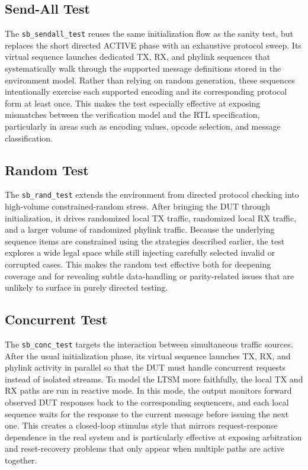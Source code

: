 \subsection{Send-All Test}
The \texttt{sb\_sendall\_test} reuses the same initialization flow as the sanity test, but replaces the short directed ACTIVE phase with an exhaustive protocol sweep. Its virtual sequence launches dedicated TX, RX, and phylink sequences that systematically walk through the supported message definitions stored in the environment model. Rather than relying on random generation, these sequences intentionally exercise each supported encoding and its corresponding protocol form at least once. This makes the test especially effective at exposing mismatches between the verification model and the RTL specification, particularly in areas such as encoding values, opcode selection, and message classification.

\subsection{Random Test}
The \texttt{sb\_rand\_test} extends the environment from directed protocol checking into high-volume constrained-random stress. After bringing the DUT through initialization, it drives randomized local TX traffic, randomized local RX traffic, and a larger volume of randomized phylink traffic. Because the underlying sequence items are constrained using the strategies described earlier, the test explores a wide legal space while still injecting carefully selected invalid or corrupted cases. This makes the random test effective both for deepening coverage and for revealing subtle data-handling or parity-related issues that are unlikely to surface in purely directed testing.

\subsection{Concurrent Test}
The \texttt{sb\_conc\_test} targets the interaction between simultaneous traffic sources. After the usual initialization phase, its virtual sequence launches TX, RX, and phylink activity in parallel so that the DUT must handle concurrent requests instead of isolated streams. To model the LTSM more faithfully, the local TX and RX paths are run in reactive mode. In this mode, the output monitors forward observed DUT responses back to the corresponding sequencers, and each local sequence waits for the response to the current message before issuing the next one. This creates a closed-loop stimulus style that mirrors request-response dependence in the real system and is particularly effective at exposing arbitration and reset-recovery problems that only appear when multiple paths are active together.

